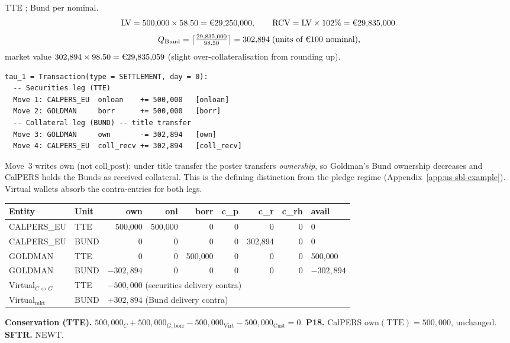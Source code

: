 \documentclass[11pt,a4paper]{article}
\newcommand{\EUR}[1]{\mbox{\texteuro#1}}
\begin{document}
TTE \EUR{58.50}; Bund \EUR{98.50} per \EUR{100} nominal.
\[
\mathrm{LV} = 500{,}000 \times 58.50 = \text{\EUR{29,250,000}}, \qquad
\mathrm{RCV} = \mathrm{LV} \times 102\% = \text{\EUR{29,835,000}}.
\]
\[
Q_{\mathrm{Bund}} = \left\lceil \tfrac{29{,}835{,}000}{98.50} \right\rceil = 302{,}894 \;\text{(units of \EUR{100} nominal)},
\]
market value $302{,}894 \times 98.50 = \text{\EUR{29,835,059}}$ (slight over-collateralisation from rounding up).

\begin{lstlisting}
tau_1 = Transaction(type = SETTLEMENT, day = 0):
  -- Securities leg (TTE)
  Move 1: CALPERS_EU  onloan    += 500,000   [onloan]
  Move 2: GOLDMAN     borr      += 500,000   [borr]
  -- Collateral leg (BUND) -- title transfer
  Move 3: GOLDMAN     own       -= 302,894   [own]
  Move 4: CALPERS_EU  coll_recv += 302,894   [coll_recv]
\end{lstlisting}

\noindent Move~3 writes $\mathrm{own}$ (not $\mathrm{coll\_post}$): under title transfer the poster transfers \emph{ownership}, so Goldman's Bund ownership decreases and CalPERS holds the Bunds as received collateral. This is the defining distinction from the pledge regime (Appendix~\ref{app:us-sbl-example}). Virtual wallets absorb the contra-entries for both legs.

\begin{center}\small
\begin{tabular}{l l r r r r r r l}
\toprule
\textbf{Entity} & \textbf{Unit} & own & onl & borr & c\_p & c\_r & c\_rh & avail \\
\midrule
CALPERS\_EU & TTE & 500{,}000 & 500{,}000 & 0 & 0 & 0 & 0 & 0 \\
CALPERS\_EU & BUND & 0 & 0 & 0 & 0 & 302{,}894 & 0 & 0 \\
GOLDMAN & TTE & 0 & 0 & 500{,}000 & 0 & 0 & 0 & 500{,}000 \\
GOLDMAN & BUND & $-302{,}894$ & 0 & 0 & 0 & 0 & 0 & $-302{,}894$ \\
Virtual$_{C{\leftrightarrow}G}$ & TTE & \multicolumn{7}{l}{$-500{,}000$ (securities delivery contra)} \\
Virtual$_{\mathrm{mkt}}$ & BUND & \multicolumn{7}{l}{$+302{,}894$ (Bund delivery contra)} \\
\bottomrule
\end{tabular}
\end{center}

\noindent\textbf{Conservation (TTE).} $500{,}000_C + 500{,}000_{G,\mathrm{borr}} - 500{,}000_{\mathrm{Virt}} - 500{,}000_{\mathrm{Cust}} = 0$. \checkmark\quad
\textbf{P18.} CalPERS $\mathrm{own}(\text{TTE}) = 500{,}000$, unchanged. \checkmark\quad
\textbf{SFTR.} NEWT.
\end{document}
